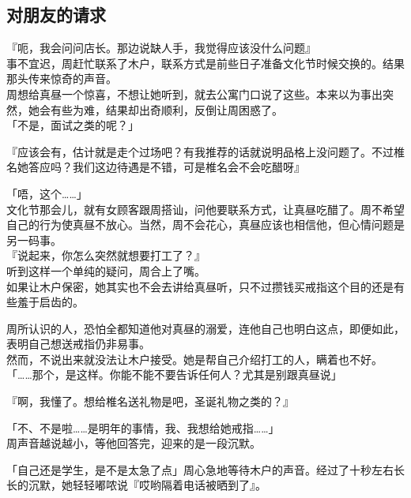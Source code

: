 \subsection{对朋友的请求}

『呃，我会问问店长。那边说缺人手，我觉得应该没什么问题』\\

事不宜迟，周赶忙联系了木户，联系方式是前些日子准备文化节时候交换的。结果那头传来惊奇的声音。\\

周想给真昼一个惊喜，不想让她听到，就去公寓门口说了这些。本来以为事出突然，她会有些为难，结果却出奇顺利，反倒让周困惑了。\\

「不是，面试之类的呢？」

『应该会有，估计就是走个过场吧？有我推荐的话就说明品格上没问题了。不过椎名她答应吗？我们这边待遇是不错，可是椎名会不会吃醋呀』

「唔，这个……」\\

文化节那会儿，就有女顾客跟周搭讪，问他要联系方式，让真昼吃醋了。周不希望自己的行为使真昼不放心。当然，周不会花心，真昼应该也相信他，但心情问题是另一码事。\\

『说起来，你怎么突然就想要打工了？』\\

听到这样一个单纯的疑问，周合上了嘴。\\

如果让木户保密，她其实也不会去讲给真昼听，只不过攒钱买戒指这个目的还是有些羞于启齿的。

周所认识的人，恐怕全都知道他对真昼的溺爱，连他自己也明白这点，即便如此，表明自己想送戒指仍非易事。\\

然而，不说出来就没法让木户接受。她是帮自己介绍打工的人，瞒着也不好。\\

「……那个，是这样。你能不能不要告诉任何人？尤其是别跟真昼说」

『啊，我懂了。想给椎名送礼物是吧，圣诞礼物之类的？』

「不、不是啦……是明年的事情，我、我想给她戒指……」\\

周声音越说越小，等他回答完，迎来的是一段沉默。

「自己还是学生，是不是太急了点」周心急地等待木户的声音。经过了十秒左右长长的沉默，她轻轻嘟哝说『哎哟隔着电话被晒到了』。\\

